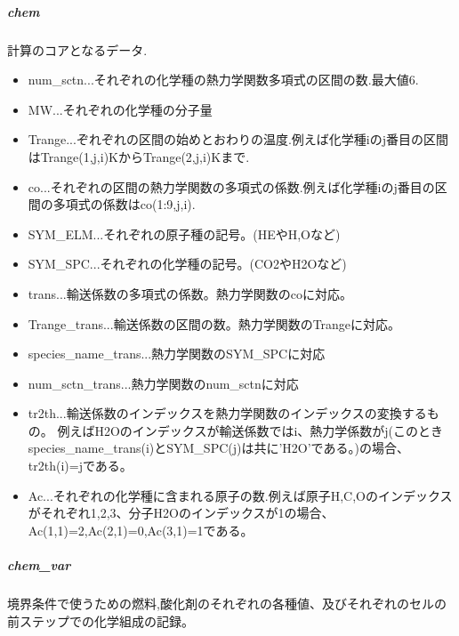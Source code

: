 \documentclass{jsarticle}
\begin{document}
\subparagraph{chem}計算のコアとなるデータ.
\begin{itemize}
\item num\_sctn...それぞれの化学種の熱力学関数多項式の区間の数.最大値6.
\item MW...それぞれの化学種の分子量
\item Trange...ぞれぞれの区間の始めとおわりの温度.例えば化学種iのj番目の区間はTrange(1,j,i)KからTrange(2,j,i)Kまで.
\item co...それぞれの区間の熱力学関数の多項式の係数.例えば化学種iのj番目の区間の多項式の係数はco(1:9,j,i).
\item SYM\_ELM...それぞれの原子種の記号。(HEやH,Oなど)
\item SYM\_SPC...それぞれの化学種の記号。(CO2やH2Oなど)
\item trans...輸送係数の多項式の係数。熱力学関数のcoに対応。
\item Trange\_trans...輸送係数の区間の数。熱力学関数のTrangeに対応。
\item species\_name\_trans...熱力学関数のSYM\_SPCに対応
\item num\_sctn\_trans...熱力学関数のnum\_sctnに対応
\item tr2th...輸送係数のインデックスを熱力学関数のインデックスの変換するもの。
例えばH2Oのインデックスが輸送係数ではi、熱力学係数がj(このときspecies\_name\_trans(i)とSYM\_SPC(j)は共に'H2O'である。)の場合、
tr2th(i)=jである。
\item Ac...それぞれの化学種に含まれる原子の数.例えば原子H,C,Oのインデックスがそれぞれ1,2,3、分子H2Oのインデックスが1の場合、Ac(1,1)=2,Ac(2,1)=0,Ac(3,1)=1である。
\end{itemize}

\subparagraph{chem\_var}境界条件で使うための燃料,酸化剤のそれぞれの各種値、及びそれぞれのセルの前ステップでの化学組成の記録。
\end{document}
